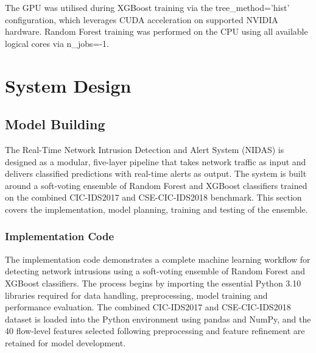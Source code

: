 \documentclass[12pt,a4paper]{report}
\begin{document}
The GPU was utilised during XGBoost training via the tree\_method='hist' configuration, which leverages CUDA acceleration on supported NVIDIA hardware. Random Forest training was performed on the CPU using all available logical cores via n\_jobs=-1.


\newpage
{}
\chapter{System Design}

\section{Model Building}

The Real-Time Network Intrusion Detection and Alert System (NIDAS) is designed as a modular, five-layer pipeline that takes network traffic as input and delivers classified predictions with real-time alerts as output. The system is built around a soft-voting ensemble of Random Forest and XGBoost classifiers trained on the combined CIC-IDS2017 and CSE-CIC-IDS2018 benchmark. This section covers the implementation, model planning, training and testing of the ensemble.

\subsection{Implementation Code}

The implementation code demonstrates a complete machine learning workflow for detecting network intrusions using a soft-voting ensemble of Random Forest and XGBoost classifiers. The process begins by importing the essential Python 3.10 libraries required for data handling, preprocessing, model training and performance evaluation. The combined CIC-IDS2017 and CSE-CIC-IDS2018 dataset is loaded into the Python environment using pandas and NumPy, and the 40 flow-level features selected following preprocessing and feature refinement are retained for model development.
\end{document}
